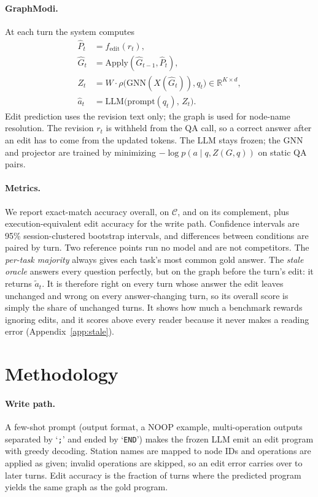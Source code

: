 \documentclass[11pt]{article}
\begin{document}
\paragraph{GraphModi.}
At each turn the system computes
\begin{align}
\hat{P}_t &= f_{\mathrm{edit}}(r_t), \\
\hat{G}_t &= \mathrm{Apply}(\hat{G}_{t-1},\hat{P}_t), \\
Z_t &= W\cdot\rho\bigl(\mathrm{GNN}(X(\hat{G}_t)),q_t\bigr)\in\mathbb{R}^{K\times d}, \\
\hat{a}_t &= \mathrm{LLM}\bigl(\mathrm{prompt}(q_t),\,Z_t\bigr).
\end{align}
Edit prediction uses the revision text only; the graph is used for node-name resolution.
The revision $r_t$ is withheld from the QA call, so a correct answer after an edit has to come from the updated tokens.
The LLM stays frozen; the GNN and projector are trained by minimizing $-\log p(a\mid q,Z(G,q))$ on static QA pairs.

\paragraph{Metrics.}
We report exact-match accuracy overall, on $\mathcal{C}$, and on its complement, plus execution-equivalent edit accuracy for the write path.
Confidence intervals are 95\% session-clustered bootstrap intervals, and differences between conditions are paired by turn.
Two reference points run no model and are not competitors.
The \emph{per-task majority} always gives each task's most common gold answer.
The \emph{stale oracle} answers every question perfectly, but on the graph before the turn's edit: it returns $\tilde{a}_t$.
It is therefore right on every turn whose answer the edit leaves unchanged and wrong on every answer-changing turn, so its overall score is simply the share of unchanged turns.
It shows how much a benchmark rewards ignoring edits, and it scores above every reader because it never makes a reading error (Appendix~\ref{app:stale}).

\section{Methodology}
\label{sec:method}

\paragraph{Write path.}
A few-shot prompt (output format, a NOOP example, multi-operation outputs separated by `\texttt{;}' and ended by `\texttt{END}') makes the frozen LLM emit an edit program with greedy decoding.
Station names are mapped to node IDs and operations are applied as given; invalid operations are skipped, so an edit error carries over to later turns.
Edit accuracy is the fraction of turns where the predicted program yields the same graph as the gold program.
\end{document}
